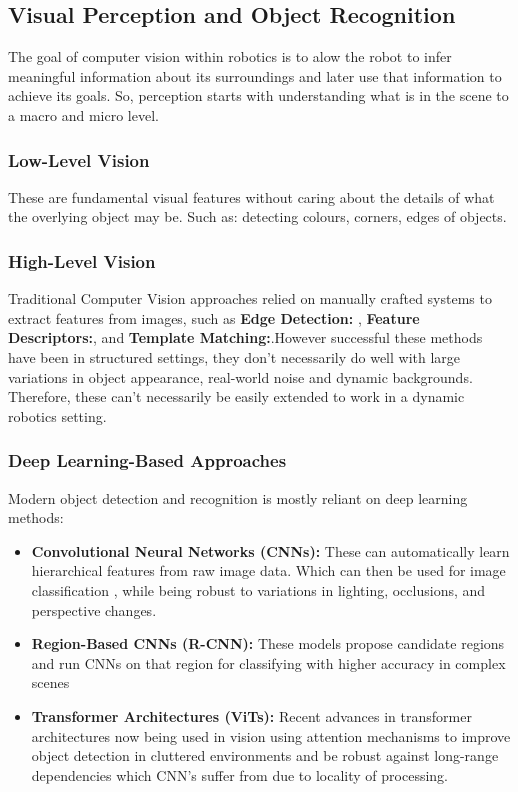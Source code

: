   \subsection{Visual Perception and Object Recognition}
  The goal of computer vision within robotics is to alow the robot to infer meaningful information about its surroundings and later use that information to achieve its goals. So, perception starts with understanding what is in the scene to a macro and micro level. 
  
  \subsubsection{Low-Level Vision}
    These are fundamental visual features without caring about the details of what the overlying object may be. Such as: detecting colours, corners, edges of objects. 

  \subsubsection{High-Level Vision}
    Traditional Computer Vision approaches relied on manually crafted systems to extract features from images, such as \textbf{Edge Detection:} \cite{canny1986computational, derpanis2004harris}, \textbf{Feature Descriptors:}\cite{wu2013comparative,juan2009comparison, rublee2011orb}, and \textbf{Template Matching:}\cite{brunelli2009template}.However successful these methods have been in structured settings, they don't necessarily do well with large variations in object appearance, real-world noise and dynamic backgrounds. Therefore, these can't necessarily be easily extended to work in a dynamic robotics setting.

    \subsubsection{Deep Learning-Based Approaches}
    Modern object detection and recognition is mostly reliant on deep learning methods:
    \begin{itemize}
      \item \textbf{Convolutional Neural Networks (CNNs):} These \cite{gu2018recent,li2021survey} can automatically learn hierarchical features from raw image data. Which can then be used for image classification \cite{hijazi2015using,traore2018deep}, while being robust to variations in lighting, occlusions, and perspective changes.
      \item \textbf{Region-Based CNNs (R-CNN):} These models propose candidate regions and run CNNs on that region for classifying with higher accuracy in complex scenes \cite{bharati2020deep, girshick2015fastrcnn}
      \item \textbf{Transformer Architectures (ViTs):} Recent advances in transformer architectures \cite{bi2021transformer} now being used in vision using attention mechanisms to improve object detection in cluttered environments \cite{kayacan2024vision} and be robust against long-range dependencies which CNN's suffer from due to locality of processing.
    \end{itemize}

